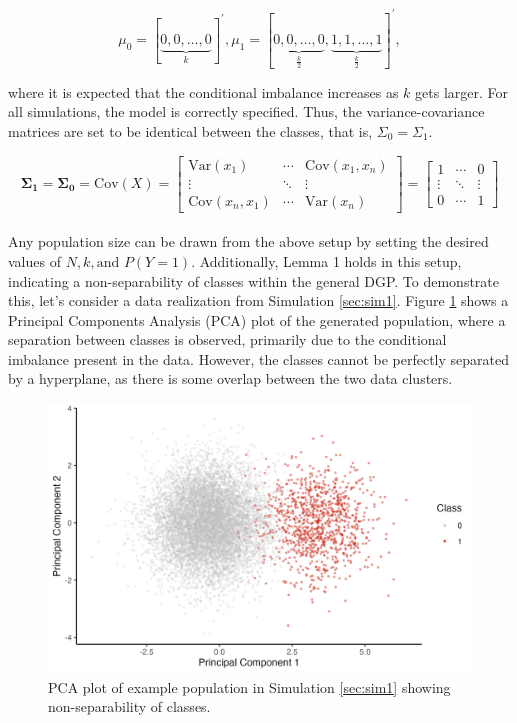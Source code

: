 \begin{equation}
    \nonumber {\mu}_0=[\underbrace{0,0, \ldots, 0}_{k}]^{\prime},
    {\mu}_1=[\underbrace{0,0, \ldots, 0}_{\frac{k}{2}}, \underbrace{1,1, \ldots, 1}_{\frac{k}{2}}]^{\prime},
\end{equation}

where it is expected that the conditional imbalance increases as $k$ gets larger. For all simulations, the model is correctly specified. Thus, the variance-covariance matrices are set to be identical between the classes, that is, $\Sigma_0 = \Sigma_1$. 

\[
	\mathbfup{\Sigma_1} =
	\mathbfup{\Sigma_0} =
	\mathup{Cov}(X) =
	\begin{bmatrix}
		\mathup{Var}(x_1)      & \cdots & \mathup{Cov}(x_1, x_n) \\[-2.5pt]
		\vdots                 & \ddots & \vdots                 \\
		\mathup{Cov}(x_n, x_1) & \cdots & \mathup{Var}(x_n)
	\end{bmatrix} =
	\begin{bmatrix}
		1      & \cdots & 0 \\[-2.5pt]
		\vdots                 & \ddots & \vdots                 \\
		0 & \cdots & 1
	\end{bmatrix}
\]
\\

Any population size can be drawn from the above setup by setting the desired values of $N, k, \text{and } P(Y=1)$. Additionally, Lemma 1 holds in this setup, indicating a non-separability of classes within the general DGP. To demonstrate this, let's consider a data realization from Simulation \ref{sec:sim1}. Figure \ref{fig:pca1} shows a Principal Components Analysis (PCA) plot of the generated population, where a separation between classes is observed, primarily due to the conditional imbalance present in the data. However, the classes cannot be perfectly separated by a hyperplane, as there is some overlap between the two data clusters.


\begin{figure}[ht]
   \centering
   \includegraphics[scale=0.6]{2_Figures/plot_pca_1.png}
   \caption[PCA plot (DGP example)]{PCA plot of example population in Simulation \ref{sec:sim1} showing non-separability of classes.}
   \label{fig:pca1}
\end{figure}


